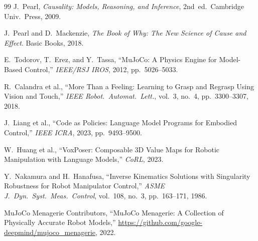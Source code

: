 \documentclass[journal]{IEEEtran}
\begin{document}
\begin{thebibliography}{99}
J.~Pearl, \emph{Causality: Models, Reasoning, and Inference},
2nd~ed.\ Cambridge Univ.\ Press, 2009.

J.~Pearl and D.~Mackenzie, \emph{The Book of Why: The New Science
of Cause and Effect}. Basic Books, 2018.

E.~Todorov, T.~Erez, and Y.~Tassa,
``MuJoCo: A Physics Engine for Model-Based Control,''
\emph{IEEE/RSJ IROS}, 2012, pp.~5026--5033.

R.~Calandra et al., ``More Than a Feeling: Learning to Grasp and
Regrasp Using Vision and Touch,''
\emph{IEEE Robot.\ Automat.\ Lett.}, vol.~3, no.~4,
pp.~3300--3307, 2018.

J.~Liang et al., ``Code as Policies: Language Model Programs for
Embodied Control,'' \emph{IEEE ICRA}, 2023, pp.~9493--9500.

W.~Huang et al., ``VoxPoser: Composable 3D Value Maps for Robotic
Manipulation with Language Models,'' \emph{CoRL}, 2023.

Y.~Nakamura and H.~Hanafusa, ``Inverse Kinematics Solutions with
Singularity Robustness for Robot Manipulator Control,''
\emph{ASME J.\ Dyn.\ Syst.\ Meas.\ Control}, vol.~108, no.~3,
pp.~163--171, 1986.

MuJoCo Menagerie Contributors, ``MuJoCo Menagerie: A Collection of
Physically Accurate Robot Models,'' \url{https://github.com/google-deepmind/mujoco\_menagerie}, 2022.

\end{thebibliography}
\end{document}
